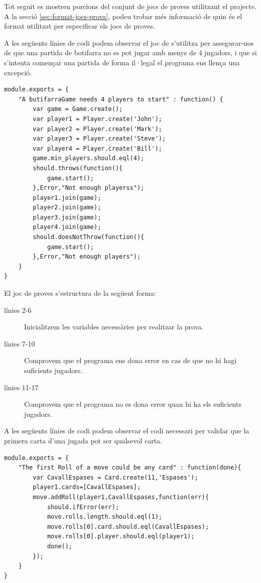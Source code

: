 Tot seguit es mostren porcions del conjunt de jocs de proves utilitzant el projecte. A la secció \ref{sec:format-jocs-prova}, podeu trobar més informació de quin és el format utilitzat per especificar els jocs de proves. 

A les següents línies de codi podem observar el joc de s'utilitza per assegurar-nos de que una partida de botifarra no es pot jugar amb menys de 4 jugadors, i que si s'intenta començar una partida de forma il·legal el programa ens llença una excepció. 

\begin{lstlisting}
module.exports = {
    "A butifarraGame needs 4 players to start" : function() {
        var game = Game.create();
        var player1 = Player.create('John');
        var player2 = Player.create('Mark');
        var player3 = Player.create('Steve');
        var player4 = Player.create('Bill');
        game.min_players.should.eql(4);
        should.throws(function(){
            game.start();
        },Error,"Not enough playerss");
        player1.join(game);
        player2.join(game);
        player3.join(game);
        player4.join(game);
        should.doesNotThrow(function(){
            game.start();
        },Error,"Not enough players");      
    }
}
\end{lstlisting}

El joc de proves s'estructura de la següent forma:

\begin{description}
    \item[línies 2-6]{Inicialitzem les variables necessàries per realitzar la prova.}
    \item[línies 7-10]{Comprovem que el programa ens dona error en cas de que no hi hagi suficients jugadors.}
    \item[línies 11-17]{Comprovem que el programa no es dona error quan hi ha els suficients jugadors.}
\end{description}

A les següents línies de codi podem observar el codi necessari per validar que la primera carta d'una jugada pot ser qualsevol carta.

\begin{lstlisting}
module.exports = {
    "The first Roll of a move could be any card" : function(done){
        var CavallEspases = Card.create(11,'Espases');
        player1.cards=[CavallEspases];
        move.addRoll(player1,CavallEspases,function(err){
            should.ifError(err);
            move.rolls.length.should.eql(1);
            move.rolls[0].card.should.eql(CavallEspases);
            move.rolls[0].player.should.eql(player1);
            done();
        });
    }
}
\end{lstlisting}

